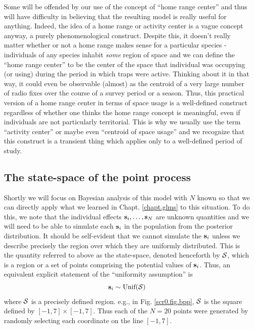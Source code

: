 Some will be offended by our use of the concept of ``home range
center'' and thus will have difficulty in believing that the resulting
model is really useful for anything.  Indeed, the idea of a home range
or activity center is a vague concept anyway, a purely
phenomenological construct.  Despite this, it doesn't really matter
whether or not a home range makes sense for a particular species -
individuals of any species inhabit {\it some} region of space and we
can define the ``home range center'' to be the center of the space
that individual was occupying (or using) during the period in which
traps were active. Thinking about it in that way, it could even be
observable (almost) as the centroid of a very large number of radio
fixes over the course of a survey period or a season.  Thus, this
practical version of a home range center in terms of space usage is a well-defined construct
regardless of whether one thinks the home range concept is meaningful,
even if individuals are not particularly territorial.  This is why we
usually use the term ``activity center'' or maybe even ``centroid of
space usage'' and we recognize that this construct is a transient
thing which applies only to a well-defined period of study.



\subsection{The state-space of the point process}

Shortly we will focus on Bayesian analysis of this model with $N$
known so that we can directly apply what we learned in
Chapt. \ref{chapt.glms} to 
this situation. To do this, we note that the individual effects ${\bf
  s}_{i},\ldots, {\bf s}_{N}$ are unknown quantities and we will need
to be able to simulate each ${\bf s}_{i}$ in the population from the
posterior distribution.  It should be self-evident that we cannot
simulate the ${\bf s}_{i}$ unless we describe precisely the region
over which they are uniformly distributed. This is
the quantity referred to above as the state-space, denoted henceforth
by ${\cal S}$, which is a region or a set of points comprising the
potential values of ${\bf s}_{i}$. Thus, an equivalent explicit
statement of the ``uniformity assumption'' is
\[
{\bf s}_{i} \sim \mbox{Unif}({\cal S})
\]
where ${\cal S}$ is a precisely defined region. e.g., in Fig. 
\ref{scr0.fig.bpp}, ${\cal S}$ is the square defined by $[-1,7] \times
[-1, 7]$. Thus each of the $N=20$ points were generated by randomly
selecting each coordinate on the line $[-1, 7]$. 


